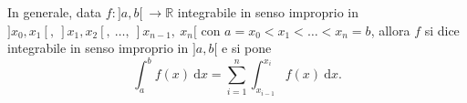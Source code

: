 In generale, data $f:]a,b[ \ \rightarrow \mathbb{R}$ integrabile in senso improprio in $]x_0,x_1[, \ ]x_1,x_2[, \ \ldots, \ ]x_{n-1}, \ x_n[$ con $a = x_0 < x_1 < \ldots < x_n = b$, allora $f$ si dice integrabile in senso improprio in $]a,b[$ e si pone 
\begin{equation*}
	\int_{a}^{b} f(x) \ \mathrm{d}x= \sum_{i=1}^{n} \int_{x_{i-1}}^{x_i} f(x) \ \mathrm{d}x.
\end{equation*}


